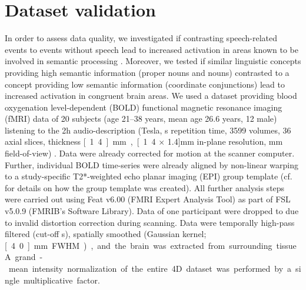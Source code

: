\documentclass[10pt,a4paper,onecolumn]{article}
\begin{document}
\section*{Dataset validation}
In order to assess data quality, we investigated if contrasting speech-related
events to events without speech lead to increased activation in areas known to
be involved in semantic processing \citep{hickok2007cortical}.
Moreover, we tested if similar linguistic concepts providing high semantic
information (proper nouns and nouns) contrasted to a concept providing low
semantic information (coordinate conjunctions) lead to increased activation in
congruent brain areas.
We used a dataset providing blood oxygenation level-dependent (BOLD) functional
magnetic resonance imaging (fMRI) data of 20 subjects (age 21–38 years, mean age
26.6 years, 12 male) listening to the 2h audio-description (\unit[7]{Tesla},
\unit[2]{s} repetition time, 3599 volumes, 36 axial slices, thickness
\unit[1.4]{mm}, \unit[1.4 $\times$ 1.4]{mm} in-plane resolution, \unit[224]{mm}
field-of-view) \citep{hanke2014audiomovie}.
Data were already corrected for motion at the scanner computer.
Further, individual BOLD time-series were already aligned by non-linear warping
to a study-specific T2*-weighted echo planar imaging (EPI) group template (cf.
\citep{hanke2014audiomovie} for details on how the group template was created).
All further analysis steps were carried out using Feat v6.00 (FMRI Expert
Analysis Tool)\citep{woolrich2001autocorr} as part of FSL v5.0.9 (FMRIB's
Software Library)\citep{smith2004fsl}.
Data of one participant were dropped to due to invalid distortion correction
during scanning.
Data were temporally high-pass filtered (cut-off \unit[150]{s}), spatially
smoothed (Gaussian kernel; \unit[4.0]{mm} FWHM), and the brain was extracted
from surrounding tissue.
A grand-mean intensity normalization of the entire 4D dataset was performed by a
single multiplicative factor.
\end{document}
